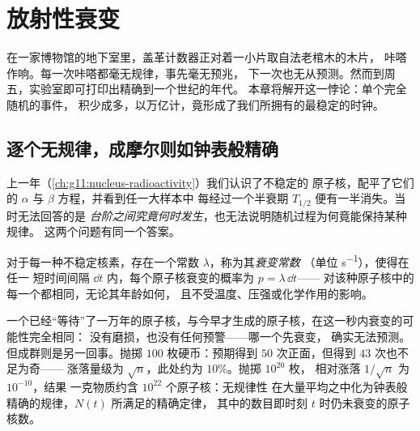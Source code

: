 \chapter{放射性衰变}\label{ch:g12:radioactive-decay}

在一家博物馆的地下室里，盖革计数器正对着一小片取自法老棺木的木片，
咔嗒作响。每一次咔嗒都毫无规律，事先毫无预兆，
下一次也无从预测。然而到周五，实验室即可打印出精确到一个世纪的年代。
本章将解开这一悖论：单个完全随机的事件，
积少成多，以万亿计，竟形成了我们所拥有的最稳定的时钟。

\section{逐个无规律，成摩尔则如钟表般精确}

上一年（\cref{ch:g11:nucleus-radioactivity}）我们认识了不稳定的
原子核，配平了它们的 $\alpha$ 与 $\beta$ 方程，并看到任一大样本中
每经过一个半衰期 $T_{1/2}$ 便有一半消失。当时无法回答的是
\emph{台阶之间究竟何时发生}，也无法说明随机过程为何竟能保持某种规律。
这两个问题有同一个答案。

\begin{definition}[衰变常数]\label{def:g12:radioactive-decay:lambda}
对于每一种不稳定核素，存在一个常数 $\lambda$，称为其\emph{衰变常数}
（单位 \unit{s^{-1}}），使得在任一
短时间间隔 $\dd t$ 内，每个原子核衰变的概率为 $p = \lambda\,\dd t$——
对该种原子核中的每一个都相同，无论其年龄如何，
且不受温度、压强或化学作用的影响。
\end{definition}

\begin{remark}\label{rem:g12:radioactive-decay:crowds}
一个已经“等待”了一万年的原子核，与今早才生成的原子核，在这一秒内衰变的可能性完全相同：
没有磨损，也没有任何预警——哪一个先衰变，
确实无法预测。但成群则是另一回事。抛掷
$100$ 枚硬币：预期得到 $50$ 次正面，但得到 $43$ 次也不足为奇——
涨落量级为 $\sqrt n$，此处约为 $10\%$。抛掷 $10^{20}$ 枚，
相对涨落 $1/\sqrt n$ 为 $10^{-10}$，结果
一克物质约含 $10^{22}$ 个原子核：无规律性
在大量平均之中化为钟表般精确的规律，$N(t)$ 所满足的精确定律，
其中的数目即时刻 $t$ 时仍未衰变的原子核数。
\end{remark}

